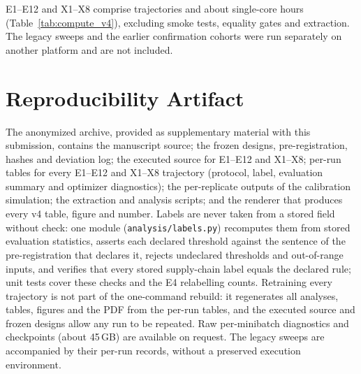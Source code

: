 E1--E12 and X1--X8 comprise \VfourTrajectories{} trajectories and about \VfourCoreHours{} single-core hours
(Table~\ref{tab:compute_v4}), excluding smoke tests, equality gates and extraction. The legacy sweeps and
the earlier confirmation cohorts were run separately on another platform and are not included.


\FloatBarrier

\section{Reproducibility Artifact}
\label{app:artifact}

The anonymized archive, provided as supplementary material with this submission, contains the manuscript source; the frozen designs, pre-registration, hashes and
deviation log; the executed source for E1--E12 and X1--X8; per-run tables for every E1--E12 and X1--X8 trajectory (protocol,
label, evaluation summary and optimizer diagnostics); the per-replicate outputs of the calibration simulation; the extraction and analysis scripts; and the
renderer that produces every v4 table, figure and number. Labels are never taken from a stored field without
check: one module (\texttt{analysis/labels.py}) recomputes them from stored evaluation statistics, asserts each
declared threshold against the sentence of the pre-registration that declares it, rejects undeclared thresholds
and out-of-range inputs, and verifies that every stored supply-chain label equals the declared rule; unit tests
cover these checks and the E4 relabelling counts. Retraining every
trajectory is not part of the one-command rebuild: it regenerates all analyses, tables, figures and the PDF from
the per-run tables, and the executed source and frozen designs allow any run to be repeated. Raw per-minibatch diagnostics and checkpoints
(about 45\,GB) are available on request. The legacy sweeps are accompanied by their per-run records,
without a preserved execution environment.
